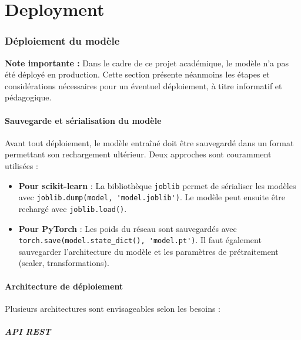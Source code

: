 \documentclass[11pt,a4paper]{article}
\newcommand{\currentpart}{}
\let\oldpart\part
\renewcommand{\part}[1]{%
  \oldpart{#1}%
  \renewcommand{\currentpart}{\thepart.\ #1}%
  \markboth{\currentpart}{}%
}
\begin{document}
\clearpage
\part{Deployment}
\section{Déploiement du modèle}

\textbf{Note importante :} Dans le cadre de ce projet académique, le modèle n'a pas été déployé en production. Cette section présente néanmoins les étapes et considérations nécessaires pour un éventuel déploiement, à titre informatif et pédagogique.

\subsection{Sauvegarde et sérialisation du modèle}

Avant tout déploiement, le modèle entraîné doit être sauvegardé dans un format permettant son rechargement ultérieur. Deux approches sont couramment utilisées :

\begin{itemize}[noitemsep]
    \item \textbf{Pour scikit-learn} : La bibliothèque \lstinline{joblib} permet de sérialiser les modèles avec \lstinline{joblib.dump(model, 'model.joblib')}. Le modèle peut ensuite être rechargé avec \lstinline{joblib.load()}.
    
    \item \textbf{Pour PyTorch} : Les poids du réseau sont sauvegardés avec \lstinline{torch.save(model.state_dict(), 'model.pt')}. Il faut également sauvegarder l'architecture du modèle et les paramètres de prétraitement (scaler, transformations).
\end{itemize}

\subsection{Architecture de déploiement}

Plusieurs architectures sont envisageables selon les besoins :

\subsubsection{API REST}
\end{document}
